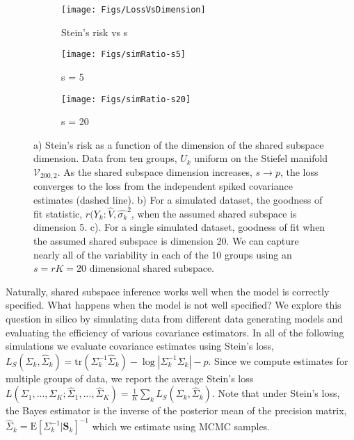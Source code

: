 \documentclass[12pt]{article}
\newcommand{\bl}[1]{{\mathbf #1}}
\newcommand{\Exp}[1]{{\text{E}}[ \ensuremath{ #1 } ]  }
\begin{document}
\begin{figure}[t]
    \centering
    \begin{subfigure}[b]{0.3\textwidth}
        \texttt{[image: Figs/LossVsDimension]}
        \caption{Stein's risk vs s}
        \label{fig:sdimension}
    \end{subfigure}
    \begin{subfigure}[b]{0.3\textwidth}
        \texttt{[image: Figs/simRatio-s5]}
        \caption{s = 5}
        \label{fig:ratio-s5}
    \end{subfigure}
    \begin{subfigure}[b]{0.3\textwidth}
        \texttt{[image: Figs/simRatio-s20]}
        \caption{s = 20}
        \label{fig:ratio-s20}
    \end{subfigure}
    \caption{a) Stein's risk as a function of the dimension of the
      shared subspace dimension.  Data from ten groups, $U_k$ uniform
      on the Stiefel manifold $\mathcal{V}_{200, 2}$.  As the shared
      subspace dimension increases, $s \rightarrow p$, the loss
      converges to the loss from the independent spiked covariance
      estimates (dashed line). b) For a simulated dataset, the
      goodness of fit statistic, $r(Y_k: \hat{V}, \hat{\sigma_k}^2$,
      when the assumed shared subspace is dimension 5.  c).  For a
      single simulated dataset, goodness of fit when the assumed
      shared subspace is dimension 20.  We can capture nearly all of
      the variability in each of the 10 groups using an $s=rK=20$
      dimensional shared subspace. }
\label{fig:dimensionPlots}
\end{figure}

Naturally, shared subspace inference works well when the model is
correctly specified.  What happens when the model is not well
specified?  We explore this question in silico by simulating data from
different data generating models and evaluating the efficiency of
various covariance estimators.  In all of the following simulations we
evaluate covariance estimates using Stein's loss,
$L_S( \Sigma_k , \hat\Sigma_k) = \text{tr}( \Sigma_k^{-1} \hat
\Sigma_k ) - \log |\Sigma_k^{-1} \Sigma_k | - p$.
Since we compute estimates for multiple groups of data, we report the
average Stein's loss
$L(\Sigma_1, ..., \Sigma_K; \hat\Sigma_1, ..., \hat\Sigma_K ) =
\frac{1}{K} \sum_k L_S( \Sigma_k , \hat\Sigma_k)$.
Note that under Stein's loss, the Bayes estimator is the inverse of
the posterior mean of the precision matrix,
$\hat \Sigma_{k} = \Exp{ \Sigma_k^{-1} | \bl S_k}^{-1}$ which we
estimate using MCMC samples.
\end{document}
